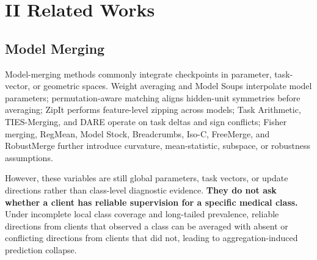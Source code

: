 \documentclass[letterpaper]{article} %
\begin{document}
\section{II Related Works}

\subsection{Model Merging}

Model-merging methods commonly integrate checkpoints in parameter, task-vector, or geometric spaces. Weight averaging and Model Soups interpolate model parameters\cite{izmailov2018averaging,pmlr-v162-wortsman22a}; permutation-aware matching aligns hidden-unit symmetries before averaging\cite{entezari2022role,ainsworth2023gitrebasinmergingmodels}; ZipIt performs feature-level zipping across models\cite{stoica2024zipit}; Task Arithmetic, TIES-Merging, and DARE operate on task deltas and sign conflicts\cite{ilharco2023editingmodelstaskarithmetic,yadav2023tiesmergingresolvinginterferencemerging,yu2024languagemodelssupermario}; Fisher merging, RegMean, Model Stock, Breadcrumbs, Iso-C, FreeMerge, and RobustMerge further introduce curvature, mean-statistic, subspace, or robustness assumptions\cite{matena2022mergingmodelsfisherweightedaveraging,jin2025datalessknowledgefusionmerging,jang2025modelstockneedjust,davari2024modelbreadcrumbsscalingmultitask,marczak2025taskleftbehindisotropic,zheng2025freemergingfouriertransformefficient,zeng2025robustmergeparameterefficientmodelmerging}.

However, these variables are still global parameters, task vectors, or update directions rather than class-level diagnostic evidence. \textbf{They do not ask whether a client has reliable supervision for a specific medical class.} Under incomplete local class coverage and long-tailed prevalence, reliable directions from clients that observed a class can be averaged with absent or conflicting directions from clients that did not, leading to aggregation-induced prediction collapse\cite{BUDA2018249,10.1371/journal.pmed.1002683}.
\end{document}
